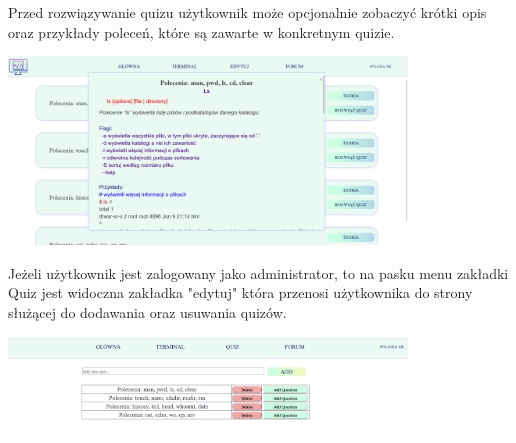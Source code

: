 \documentclass[10pt,a4paper]{report}
\begin{document}
\begin{adjustwidth}{2cm}{2cm}
\begin{minipage}{\linewidth}
\begin{center}
\end{center}
\end{minipage}
\begin{minipage}{1\linewidth}
\vspace{0.3cm}
Przed rozwiązywanie quizu użytkownik może opcjonalnie zobaczyć krótki opis oraz przykłady poleceń, które są zawarte w konkretnym quizie.\\
\end{minipage}
\begin{minipage}{\linewidth}
\begin{center}
  \includegraphics[width=400px]{project/teoria.png}
\end{center}
\end{minipage}
\begin{minipage}{1\linewidth}
\vspace{0.3cm}
Jeżeli użytkownik jest zalogowany jako administrator, to na pasku menu zakładki Quiz jest widoczna zakładka "edytuj" która przenosi użytkownika do strony służącej do dodawania oraz usuwania quizów.\\ 
\end{minipage}
\begin{minipage}{\linewidth}
\begin{center}
  \includegraphics[width=400px]{project/add_quiz.png}
\end{center}
\end{minipage}

\end{adjustwidth}
\end{document}

